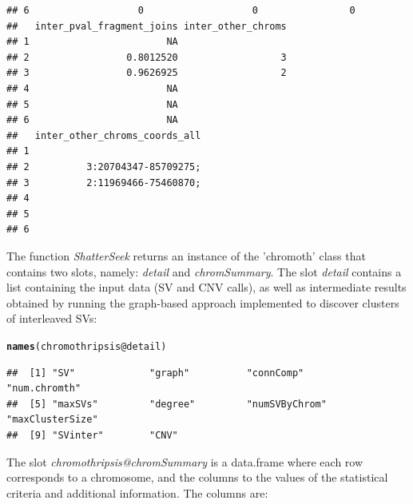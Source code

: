 \documentclass[twoside,a4wide,11pt]{article}\usepackage[]{graphicx}\usepackage[]{color}
\makeatletter
\newcommand{\hlopt}[1]{\textcolor[rgb]{0,0,0}{#1}}%
\newcommand{\hlstd}[1]{\textcolor[rgb]{0.345,0.345,0.345}{#1}}%
\newcommand{\hlkwc}[1]{\textcolor[rgb]{0.333,0.667,0.333}{#1}}%
\newcommand{\hlkwd}[1]{\textcolor[rgb]{0.737,0.353,0.396}{\textbf{#1}}}%
\newenvironment{kframe}{%
 \def\at@end@of@kframe{}%
 \ifinner\ifhmode%
  \def\at@end@of@kframe{\end{minipage}}%
  \begin{minipage}{\columnwidth}%
 \fi\fi%
 \def\FrameCommand##1{\hskip\@totalleftmargin \hskip-\fboxsep
 \colorbox{shadecolor}{##1}\hskip-\fboxsep
     \hskip-\linewidth \hskip-\@totalleftmargin \hskip\columnwidth}%
 \MakeFramed {\advance\hsize-\width
   \@totalleftmargin\z@ \linewidth\hsize
   \@setminipage}}%
 {\par\unskip\endMakeFramed%
 \at@end@of@kframe}
\newenvironment{knitrout}{}{} %
\makeatother
\begin{document}
\begin{knitrout}
\begin{kframe}
\begin{verbatim}
## 6                   0                   0                0
##   inter_pval_fragment_joins inter_other_chroms
## 1                        NA                   
## 2                 0.8012520                  3
## 3                 0.9626925                  2
## 4                        NA                   
## 5                        NA                   
## 6                        NA                   
##   inter_other_chroms_coords_all
## 1                              
## 2          3:20704347-85709275;
## 3          2:11969466-75460870;
## 4                              
## 5                              
## 6
\end{verbatim}
\end{kframe}
\end{knitrout}


The function {\it ShatterSeek} returns an instance of the 'chromoth' class that contains two slots, namely:
{\it detail} and {\it chromSummary}. 
The slot {\it detail} contains a list containing the input data (SV and CNV calls), 
as well as intermediate results obtained by running the graph-based approach
implemented to discover clusters of interleaved SVs:
\begin{knitrout}
\color{fgcolor}\begin{kframe}
\begin{alltt}
\hlkwd{names}\hlstd{(chromothripsis}\hlopt{@}\hlkwc{detail}\hlstd{)}
\end{alltt}
\begin{verbatim}
##  [1] "SV"             "graph"          "connComp"       "num.chromth"   
##  [5] "maxSVs"         "degree"         "numSVByChrom"   "maxClusterSize"
##  [9] "SVinter"        "CNV"
\end{verbatim}
\end{kframe}
\end{knitrout}

The slot {\it chromothripsis@chromSummary} is a data.frame where each row corresponds to a chromosome,
and the columns to the values of the statistical criteria and additional information.
The columns are:
\end{document}
